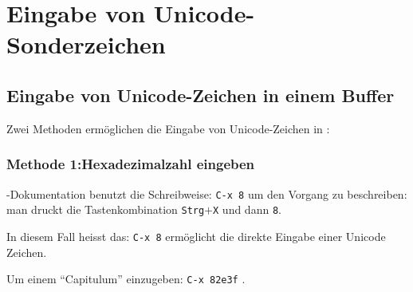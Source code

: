 \section{Eingabe von Unicode-Sonderzeichen}
\label{unicodeeingabe}

%
\subsection{Eingabe von Unicode-Zeichen in
einem  Buffer}
\label{unicodeviaemacs}

Zwei Methoden ermöglichen die Eingabe von
Unicode-Zeichen in :

\subsubsection*{Methode 1:\enspace Hexadezimalzahl eingeben}
-Dokumentation benutzt die Schreibweise: %
\texttt{C-x 8}
um den Vorgang zu beschreiben: man druckt die Tastenkombination
\texttt{Strg}$+$\texttt{X} und dann \texttt{8}.

In diesem Fall heisst das: %
\texttt{C-x 8}
ermöglicht die direkte Eingabe einer Unicode Zeichen.

Um einem \enquote{Capitulum} einzugeben: %
\texttt{C-x 8}\texttt{2e3f}
.

